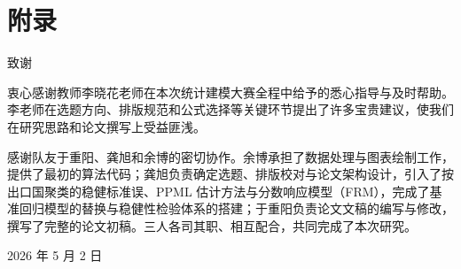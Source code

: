 \documentclass[UTF8,a4paper,12pt,fontset=none]{ctexart}
\begin{document}
\clearpage
\appendix
{}
{}
\section*{\heiti{} 附\quad 录}


\clearpage
{}
{}
\begin{center}
{\heiti{} 致\quad 谢}
\end{center}
\hspace{2em}衷心感谢教师李晓花老师在本次统计建模大赛全程中给予的悉心指导与及时帮助。李老师在选题方向、排版规范和公式选择等关键环节提出了许多宝贵建议，使我们在研究思路和论文撰写上受益匪浅。

感谢队友于重阳、龚旭和余博的密切协作。余博承担了数据处理与图表绘制工作，提供了最初的算法代码；龚旭负责确定选题、排版校对与论文架构设计，引入了按出口国聚类的稳健标准误、PPML 估计方法与分数响应模型（FRM），完成了基准回归模型的替换与稳健性检验体系的搭建；于重阳负责论文文稿的编写与修改，撰写了完整的论文初稿。三人各司其职、相互配合，共同完成了本次研究。

\vspace{0.55cm}
\begin{flushright}
2026 年 5 月 2 日
\end{flushright}
\end{document}
